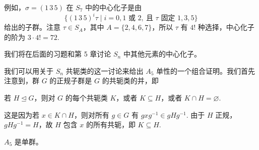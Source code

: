 例如，\(\sigma = (1\,3\,5)\) 在 \(S_7\) 中的中心化子是由
\[
\{(1\,3\,5)^i \tau \mid i = 0, 1 \text{ 或 } 2,\ \text{且 } \tau \text{ 固定 } 1, 3, 5\}
\]
给出的子群。注意 \(\tau \in S_A\)，其中 \(A = \{2, 4, 6, 7\}\)，所以 \(\tau\) 有 \(4!\) 种选择，中心化子的阶为 \(3 \cdot 4! = 72\).

我们将在后面的习题和第 5 章讨论 \(S_n\) 中其他元素的中心化子。

我们可以用关于 \(S_n\) 共轭类的这一讨论来给出 \(A_5\) 单性的一个组合证明。我们首先注意到，群 \(G\) 的正规子群是 \(G\) 的共轭类的并，即
\begin{center}
若 \(H \trianglelefteq G\)，则对 \(G\) 的每个共轭类 \(K\)，或者 \(K \subseteq H\)，或者 \(K \cap H = \varnothing\).
\end{center}
这是因为若 \(x \in K \cap H\)，则对所有 \(g \in G\) 有 \(gxg^{-1} \in gHg^{-1}\). 由于 \(H\) 正规，\(gHg^{-1} = H\)，故 \(H\) 包含 \(x\) 的所有共轭，即 \(K \subseteq H\).

\begin{theorem}\label{thm:4.12}
\(A_5\) 是单群。
\end{theorem}

